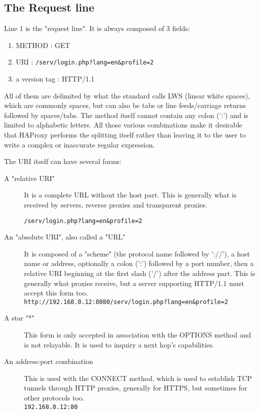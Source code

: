 \subsection{The Request line}
Line 1 is the "request line". It is always composed of 3 fields:

\begin{enumerate}
  \item METHOD : GET
  \item URI : \verb|/serv/login.php?lang=en&profile=2|
  \item a version tag : HTTP/1.1
\end{enumerate}

All of them are delimited by what the standard calls LWS (linear white spaces),
which are commonly spaces, but can also be tabs or line feeds/carriage returns
followed by spaces/tabs. The method itself cannot contain any colon (':') and
is limited to alphabetic letters. All those various combinations make it
desirable that HAProxy performs the splitting itself rather than leaving it to
the user to write a complex or inaccurate regular expression.

The URI itself can have several forms:

\begin{description}
\item[A "relative URI"]
    It is a complete URL without the host part. This is generally what is
    received by servers, reverse proxies and transparent proxies.
    
    \verb|/serv/login.php?lang=en&profile=2|

\item[An "absolute URI", also called a "URL"]
    It is composed of a "scheme" (the protocol name followed by '://'), a host
    name or address, optionally a colon (':') followed by a port number, then
    a relative URI beginning at the first slash ('/') after the address part.
    This is generally what proxies receive, but a server supporting HTTP/1.1
    must accept this form too.\\
    \verb|http://192.168.0.12:8080/serv/login.php?lang=en&profile=2|

\item[A star "*"]
    This form is only accepted in association with the OPTIONS
    method and is not relayable. It is used to inquiry a next hop's
    capabilities.

\item[An address:port combination]
    This is used with the CONNECT method, which is used to establish TCP
    tunnels through HTTP proxies, generally for HTTPS, but sometimes for
    other protocols too.\\
    \verb|192.168.0.12:80|
\end{description}

